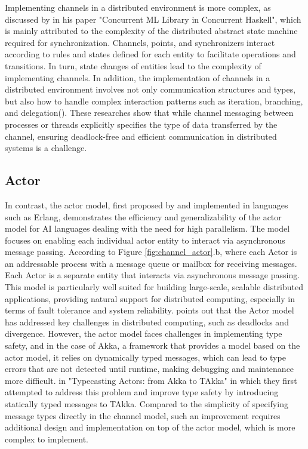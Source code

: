 \documentclass{l4proj}
\begin{document}
Implementing channels in a distributed environment is more complex, as discussed by \cite{chaudhuri_2009_a} in his paper "Concurrent ML Library in Concurrent Haskell", which is mainly attributed to the complexity of the distributed abstract state machine required for synchronization. Channels, points, and synchronizers interact according to rules and states defined for each entity to facilitate operations and transitions. In turn, state changes of entities lead to the complexity of implementing channels. In addition, the implementation of channels in a distributed environment involves not only communication structures and types, but also how to handle complex interaction patterns such as iteration, branching, and delegation(\cite{hu_sessionbased}). These researches show that while channel messaging between processes or threads explicitly specifies the type of data transferred by the channel, ensuring deadlock-free and efficient communication in distributed systems is a challenge.


\subsection{Actor}
In contrast, the actor model, first proposed by \cite{hewitt_a} and implemented in languages such as Erlang, demonstrates the efficiency and generalizability of the actor model for AI languages dealing with the need for high parallelism. The model focuses on enabling each individual actor entity to interact via asynchronous message passing. According to Figure \ref{fig:channel_actor}.b, where each Actor is an addressable process with a message queue or mailbox for receiving messages. Each Actor is a separate entity that interacts via asynchronous message passing. This model is particularly well suited for building large-scale, scalable distributed applications, providing natural support for distributed computing, especially in terms of fault tolerance and system reliability. \cite{agha_1985_actors} points out that the Actor model has addressed key challenges in distributed computing, such as deadlocks and divergence. However, the actor model faces challenges in implementing type safety, and in the case of Akka, a framework that provides a model based on the actor model, it relies on dynamically typed messages, which can lead to type errors that are not detected until runtime, making debugging and maintenance more difficult. \cite{he_2014_typecasting} in "Typecasting Actors: from Akka to TAkka" in which they first attempted to address this problem and improve type safety by introducing statically typed messages to TAkka. Compared to the simplicity of specifying message types directly in the channel model, such an improvement requires additional design and implementation on top of the actor model, which is more complex to implement.
\end{document}
